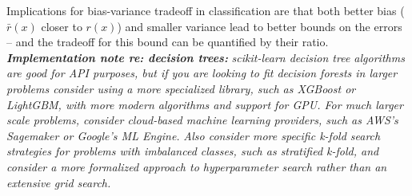 Implications for bias-variance tradeoff in classification are that both
better bias (\(\bar{r}(x)\) closer to \(r(x)\)) and smaller
variance lead to better bounds on the errors -- and the tradeoff for
this bound can be quantified by their ratio.
\textbf{\emph{Implementation note re: decision trees:}}
\emph{scikit-learn decision tree algorithms are good for API purposes,
but if you are looking to fit decision forests in larger problems
consider using a more specialized library, such as XGBoost or LightGBM,
with more modern algorithms and support for GPU. For much larger scale
problems, consider cloud-based machine learning providers, such as AWS's
Sagemaker or Google's ML Engine.}
\emph{Also consider more specific k-fold search strategies for problems
with imbalanced classes, such as stratified k-fold, and consider a more
formalized approach to hyperparameter search rather than an extensive
grid search.}

